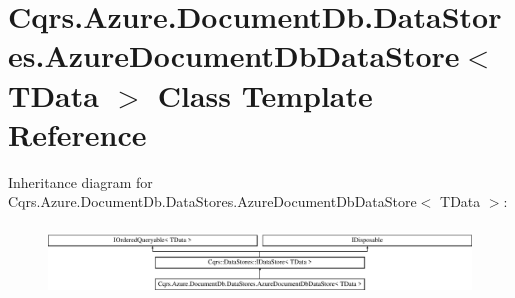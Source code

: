 \hypertarget{classCqrs_1_1Azure_1_1DocumentDb_1_1DataStores_1_1AzureDocumentDbDataStore}{}\section{Cqrs.\+Azure.\+Document\+Db.\+Data\+Stores.\+Azure\+Document\+Db\+Data\+Store$<$ T\+Data $>$ Class Template Reference}
\label{classCqrs_1_1Azure_1_1DocumentDb_1_1DataStores_1_1AzureDocumentDbDataStore}
Inheritance diagram for Cqrs.\+Azure.\+Document\+Db.\+Data\+Stores.\+Azure\+Document\+Db\+Data\+Store$<$ T\+Data $>$\+:\begin{figure}[H]
\begin{center}
\leavevmode
\includegraphics[height=1.870824cm]{classCqrs_1_1Azure_1_1DocumentDb_1_1DataStores_1_1AzureDocumentDbDataStore}
\end{center}
\end{figure}
